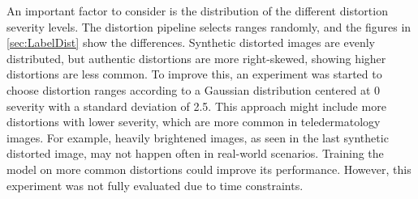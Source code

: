 \clearpage
\noindent
An important factor to consider is the distribution of the different distortion severity levels. The distortion pipeline selects ranges randomly, and the figures in \autoref{sec:LabelDist} show the differences. Synthetic distorted images are evenly distributed, but authentic distortions are more right-skewed, showing higher distortions are less common. To improve this, an experiment was started to choose distortion ranges according to a Gaussian distribution centered at 0 severity with a standard deviation of 2.5. This approach might include more distortions with lower severity, which are more common in teledermatology images. For example, heavily brightened images, as seen in the last synthetic distorted image, may not happen often in real-world scenarios. Training the model on more common distortions could improve its performance. However, this experiment was not fully evaluated due to time constraints. \par

